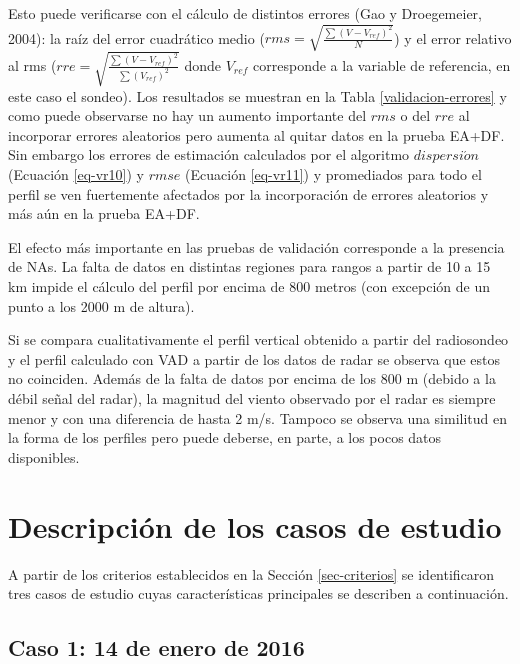 \documentclass[12pt,spanish,oneside, a4paper]{book}
\begin{document}
Esto puede verificarse con el cálculo de distintos errores (Gao y
Droegemeier, 2004): la raíz del error cuadrático medio
(\(rms = \sqrt{ \frac{\sum (V-V_{ref})^2}{N} }\)) y el error relativo al
rms (\(rre = \sqrt{ \frac{\sum (V-V_{ref})^2}{\sum (V_{ref})^2} }\)
donde \(V_{ref}\) corresponde a la variable de referencia, en este caso
el sondeo). Los resultados se muestran en la Tabla
\ref{validacion-errores} y como puede observarse no hay un aumento
importante del \(rms\) o del \(rre\) al incorporar errores aleatorios
pero aumenta al quitar datos en la prueba EA+DF. Sin embargo los errores
de estimación calculados por el algoritmo \(dispersi\acute{o}n\)
(Ecuación \ref{eq-vr10}) y \(rmse\) (Ecuación \ref{eq-vr11}) y
promediados para todo el perfil se ven fuertemente afectados por la
incorporación de errores aleatorios y más aún en la prueba EA+DF.

El efecto más importante en las pruebas de validación corresponde a la
presencia de NAs. La falta de datos en distintas regiones para rangos a
partir de 10 a 15 km impide el cálculo del perfil por encima de 800
metros (con excepción de un punto a los 2000 m de altura).

Si se compara cualitativamente el perfil vertical obtenido a partir del
radiosondeo y el perfil calculado con VAD a partir de los datos de radar
se observa que estos no coinciden. Además de la falta de datos por
encima de los 800 m (debido a la débil señal del radar), la magnitud del
viento observado por el radar es siempre menor y con una diferencia de
hasta 2 m/s. Tampoco se observa una similitud en la forma de los
perfiles pero puede deberse, en parte, a los pocos datos disponibles.

\section{Descripción de los casos de
estudio}\label{descripcion-de-los-casos-de-estudio}

A partir de los criterios establecidos en la Sección \ref{sec-criterios}
se identificaron tres casos de estudio cuyas características principales
se describen a continuación.

\subsection{Caso 1: 14 de enero de
2016}\label{caso-1-14-de-enero-de-2016}
\end{document}
